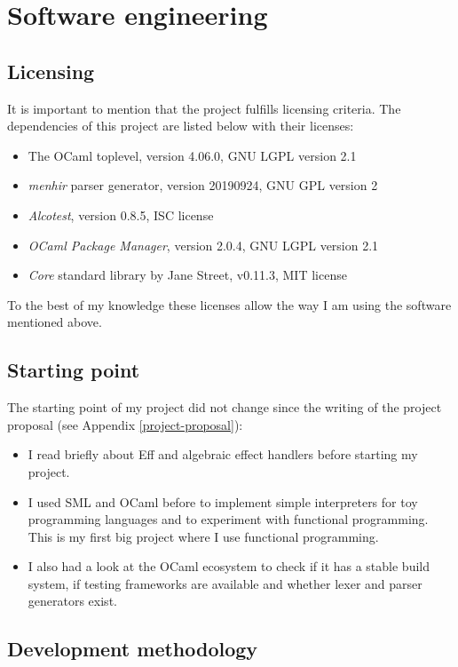 \documentclass[class=article, crop=false]{standalone}
\begin{document}
\section{Software engineering}

\subsection{Licensing}

It is important to mention that the project fulfills licensing criteria. The
dependencies of this project are listed below with their licenses:
\begin{itemize}
\item The OCaml toplevel, version 4.06.0, GNU LGPL version 2.1
\item \emph{menhir} parser generator, version 20190924, GNU GPL version 2
\item \emph{Alcotest}, version 0.8.5, ISC license
\item \emph{OCaml Package Manager}, version 2.0.4, GNU LGPL version 2.1
\item \emph{Core} standard library by Jane Street, v0.11.3, MIT license
\end{itemize}
To the best of my knowledge these licenses allow the way I am using the software
mentioned above.

\subsection{Starting point}

The starting point of my project did not change since the writing of the
project proposal (see Appendix \ref{project-proposal}):
\begin{itemize}
  \item I read briefly about Eff and algebraic effect handlers before starting
  my project.
  \item I used SML and OCaml before to implement simple interpreters for toy
  programming languages and to experiment with functional programming. This is
  my first big project where I use functional programming.
  \item I also had a look at the OCaml ecosystem to check if it has a stable
  build system, if testing frameworks are available and whether lexer and parser
  generators exist.
\end{itemize}

\subsection{Development methodology}
\end{document}
